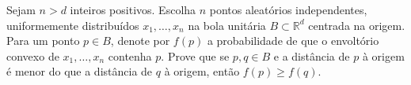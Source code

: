 Sejam \(n > d\) inteiros positivos. Escolha \(n\) pontos aleatórios independentes, uniformemente distribuídos \(x_1, \ldots, x_n\) na bola unitária \(B \subset \mathbb{R}^d\) centrada na origem. Para um ponto \(p \in B\), denote por \(f(p)\) a probabilidade de que o envoltório convexo de \(x_1, \ldots, x_n\) contenha \(p\). Prove que se \(p, q \in B\) e a distância de \(p\) à origem é menor do que a distância de \(q\) à origem, então \(f(p) \ge f(q)\).
